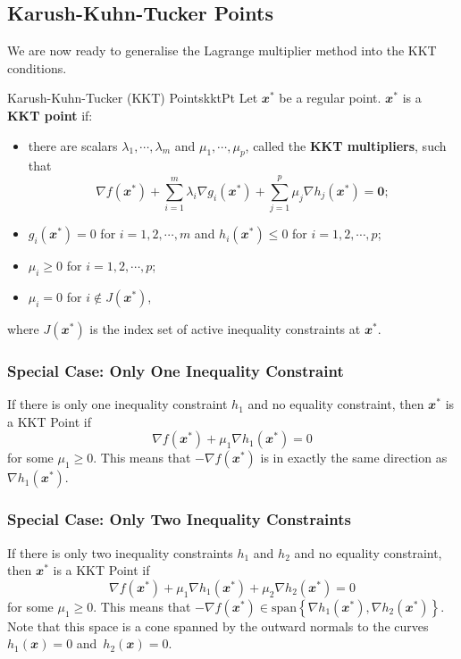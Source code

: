 \documentclass[math, code]{amznotes}
\theoremstyle{remark}
\begin{document}
\subsection{Karush-Kuhn-Tucker Points}
We are now ready to generalise the Lagrange multiplier method into the KKT conditions.
\begin{dfnbox}{Karush-Kuhn-Tucker (KKT) Points}{kktPt}
    Let $\mathbfit{x}^*$ be a regular point. $\mathbfit{x}^*$ is a {\color{red} \textbf{KKT point}} if:
    \begin{itemize}
        \item there are scalars $\lambda_1, \cdots, \lambda_m$ and $\mu_1, \cdots, \mu_p$, called the {\color{red} \textbf{KKT multipliers}}, such that
        \begin{equation*}
            \nabla f(\mathbfit{x}^*) + \sum_{i = 1}^{m}\lambda_i\nabla g_i(\mathbfit{x}^*) + \sum_{j = 1}^{p}\mu_j\nabla h_j(\mathbfit{x}^*) = \mathbf{0};
        \end{equation*}
        \item $g_i(\mathbfit{x}^*) = 0$ for $i = 1, 2, \cdots, m$ and $h_i(\mathbfit{x}^*) \leq 0$ for $i = 1, 2, \cdots, p$;
        \item $\mu_i \geq 0$ for $i = 1, 2, \cdots, p$;
        \item $\mu_i = 0$ for $i \notin J(\mathbfit{x}^*)$,
    \end{itemize}
    where $J(\mathbfit{x}^*)$ is the index set of active inequality constraints at $\mathbfit{x}^*$.
\end{dfnbox}
\subsubsection{Special Case: Only One Inequality Constraint}
If there is only one inequality constraint $h_1$ and no equality constraint, then $\mathbfit{x}^*$ is a KKT Point if
\begin{equation*}
    \nabla f(\mathbfit{x}^*) + \mu_1\nabla h_1(\mathbfit{x}^*) = 0
\end{equation*}
for some $\mu_1 \geq 0$. This means that $-\nabla f(\mathbfit{x}^*)$ is in exactly the same direction as $\nabla h_1(\mathbfit{x}^*)$.
\subsubsection{Special Case: Only Two Inequality Constraints}
If there is only two inequality constraints $h_1$ and $h_2$ and no equality constraint, then $\mathbfit{x}^*$ is a KKT Point if
\begin{equation*}
    \nabla f(\mathbfit{x}^*) + \mu_1\nabla h_1(\mathbfit{x}^*) + \mu_2\nabla h_2(\mathbfit{x}^*) = 0
\end{equation*}
for some $\mu_1 \geq 0$. This means that $-\nabla f(\mathbfit{x}^*) \in \mathrm{span}\left\{\nabla h_1(\mathbfit{x}^*), \nabla h_2(\mathbfit{x}^*)\right\}$. Note that this space is a cone spanned by the outward normals to the curves $h_1(\mathbfit{x}) = 0$ and~$h_2(\mathbfit{x}) = 0$.
\end{document}
